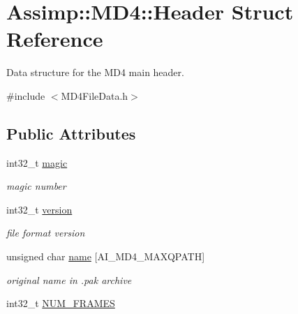 \hypertarget{struct_assimp_1_1_m_d4_1_1_header}{\section{Assimp\+:\+:M\+D4\+:\+:Header Struct Reference}
\label{struct_assimp_1_1_m_d4_1_1_header}
}


Data structure for the M\+D4 main header.  




{\ttfamily \#include $<$M\+D4\+File\+Data.\+h$>$}

\subsection*{Public Attributes}
\begin{DoxyCompactItemize}
\item 
\hypertarget{struct_assimp_1_1_m_d4_1_1_header_a81b159e2c8f342722bc7f7a594c871d0}{int32\+\_\+t \hyperlink{struct_assimp_1_1_m_d4_1_1_header_a81b159e2c8f342722bc7f7a594c871d0}{magic}}\label{struct_assimp_1_1_m_d4_1_1_header_a81b159e2c8f342722bc7f7a594c871d0}

\begin{DoxyCompactList}\small\item\em magic number \end{DoxyCompactList}\item 
\hypertarget{struct_assimp_1_1_m_d4_1_1_header_a0893fef9e64ae8d76fb7bf2fa88dbcd9}{int32\+\_\+t \hyperlink{struct_assimp_1_1_m_d4_1_1_header_a0893fef9e64ae8d76fb7bf2fa88dbcd9}{version}}\label{struct_assimp_1_1_m_d4_1_1_header_a0893fef9e64ae8d76fb7bf2fa88dbcd9}

\begin{DoxyCompactList}\small\item\em file format version \end{DoxyCompactList}\item 
\hypertarget{struct_assimp_1_1_m_d4_1_1_header_ade256f156368f553a7c46d33a215de15}{unsigned char \hyperlink{struct_assimp_1_1_m_d4_1_1_header_ade256f156368f553a7c46d33a215de15}{name} \mbox{[}A\+I\+\_\+\+M\+D4\+\_\+\+M\+A\+X\+Q\+P\+A\+T\+H\mbox{]}}\label{struct_assimp_1_1_m_d4_1_1_header_ade256f156368f553a7c46d33a215de15}

\begin{DoxyCompactList}\small\item\em original name in .pak archive \end{DoxyCompactList}\item 
\hypertarget{struct_assimp_1_1_m_d4_1_1_header_a3d89b9b568a1e08618286bd98d6b9d67}{int32\+\_\+t \hyperlink{struct_assimp_1_1_m_d4_1_1_header_a3d89b9b568a1e08618286bd98d6b9d67}{N\+U\+M\+\_\+\+F\+R\+A\+M\+E\+S}}\label{struct_assimp_1_1_m_d4_1_1_header_a3d89b9b568a1e08618286bd98d6b9d67}


\end{DoxyCompactItemize}
